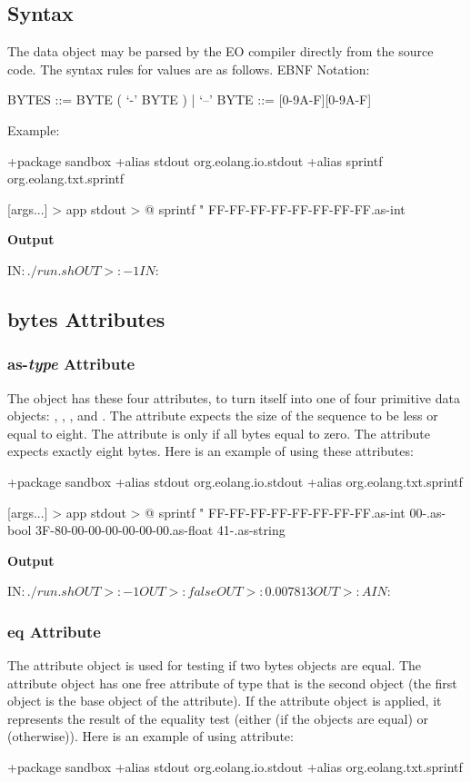 \documentclass[12pt]{book}
\begin{document}
{\subsection{Syntax}
The  data object may be parsed by the EO compiler directly from the source code. The syntax rules for  values are as follows.
EBNF Notation:
\begin{ffcode}
    BYTES   ::= BYTE ( ‘-’ BYTE ) | ‘--’
    BYTE    ::= [0-9A-F][0-9A-F]
\end{ffcode}
Example:
\begin{ffcode}
+package sandbox
+alias stdout org.eolang.io.stdout
+alias sprintf org.eolang.txt.sprintf

[args...] > app
  stdout > @
    sprintf
      "%
      FF-FF-FF-FF-FF-FF-FF-FF.as-int
\end{ffcode}  
\textbf{Output}
\begin{ffcode}
IN$: ./run.sh
OUT>: -1
IN$: 
\end{ffcode}

\subsection{bytes Attributes}

\subsubsection{as-\textit{type} Attribute}
The object  has these four attributes, to turn itself into one of four primitive data objects: , , , and .
The attribute  expects the size of the sequence to be less or equal to eight. The attribute  is  only if all bytes equal to zero. The attribute  expects exactly eight bytes.
Here is an example of using these attributes:
\begin{ffcode}
+package sandbox
+alias stdout org.eolang.io.stdout
+alias org.eolang.txt.sprintf

[args...] > app
  stdout > @
    sprintf
      "%
      FF-FF-FF-FF-FF-FF-FF-FF.as-int
      00-.as-bool
      3F-80-00-00-00-00-00-00.as-float
      41-.as-string
\end{ffcode}
\textbf{Output}
\begin{ffcode}
IN$: ./run.sh
OUT>: -1
OUT>: false
OUT>: 0.007813
OUT>: A
IN$: 
\end{ffcode}

\subsubsection{eq Attribute}
The  attribute object is used for testing if two bytes objects are equal. The  attribute object has one free attribute of type  that is the second object (the first object is the base object of the  attribute).
If the  attribute object is applied, it represents the result of the equality test (either  (if the objects are equal) or  (otherwise)).
Here is an example of using  attribute:
\begin{ffcode}
+package sandbox
+alias stdout org.eolang.io.stdout
+alias org.eolang.txt.sprintf


\end{ffcode}}
\end{document}
